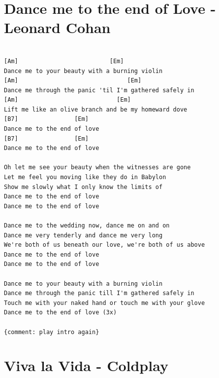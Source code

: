 \documentclass[]{book}
\let\stdsection\section
\renewcommand\section{\clearpage\stdsection}
\begin{document}
\hypertarget{dance-me-to-the-end-of-love---leonard-cohan}{%
\section{Dance me to the end of Love - Leonard Cohan}\label{dance-me-to-the-end-of-love---leonard-cohan}}

\begin{verbatim}

[Am]                          [Em]
Dance me to your beauty with a burning violin
[Am]                               [Em]
Dance me through the panic 'til I'm gathered safely in
[Am]                            [Em]
Lift me like an olive branch and be my homeward dove
[B7]                [Em]
Dance me to the end of love
[B7]                [Em]
Dance me to the end of love

Oh let me see your beauty when the witnesses are gone 
Let me feel you moving like they do in Babylon 
Show me slowly what I only know the limits of 
Dance me to the end of love 
Dance me to the end of love 

Dance me to the wedding now, dance me on and on 
Dance me very tenderly and dance me very long 
We're both of us beneath our love, we're both of us above 
Dance me to the end of love 
Dance me to the end of love

Dance me to your beauty with a burning violin 
Dance me through the panic till I'm gathered safely in 
Touch me with your naked hand or touch me with your glove 
Dance me to the end of love (3x)

{comment: play intro again}
\end{verbatim}

\hypertarget{viva-la-vida---coldplay}{%
\section{Viva la Vida - Coldplay}\label{viva-la-vida---coldplay}}
\end{document}
